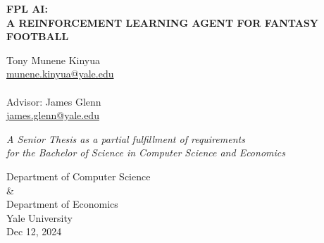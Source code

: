 \begin{titlepage}
    \begin{center}
        \vspace*{1cm}
        
        \huge
        \textbf{FPL AI: \\
        A REINFORCEMENT LEARNING AGENT FOR FANTASY FOOTBALL}
        
        \vspace{0.5cm}
        \LARGE
        
        \vspace{1cm}

        \Large
        Tony Munene Kinyua\\
        \href{munene.kinyua@yale.edu}{munene.kinyua@yale.edu}\\~\\
        Advisor: James Glenn\\
        \href{james.glenn@yale.edu}{james.glenn@yale.edu}
        
        \vfill
        
        \textit{A Senior Thesis as a partial fulfillment
        of requirements \\for the Bachelor of Science in Computer Science and Economics}
        
        \vspace{0.8cm}
        
        \Large
        Department of Computer Science\\
        \&\\
        Department of Economics\\
        Yale University\\
        Dec 12, 2024
        
    \end{center}
\end{titlepage}
